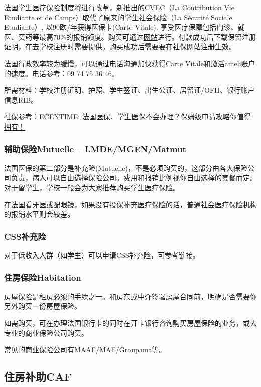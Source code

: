 \documentclass[UTF8]{ctexart}
\begin{document}
法国学生医疗保险制度将进行改革，新推出的CVEC（La Contribution Vie Etudiante et de Camps）取代了原来的学生社会保险（La Sécurité Sociale Etudiante）, 以90欧/年获得医保卡(Carte Vitale), 享受医疗保障包括门诊、就医、买药等最高70\%的报销额度。购买可通过\href{https://www.messervices.etudiant.gouv.fr}{网站}进行。付款成功后下载保留注册证明，在去学校注册时需要提供。购买成功后需要要在社保网站注册生效。

法国行政效率较为缓慢，可以通过电话沟通加快获得Carte Vitale和激活ameli账户的速度。\href{https://www.ameli.fr/paris/assure/english-pages}{电话参考}：09 74 75 36 46。

所需材料：学校注册证明、护照、学生签证、出生公证、居留证/OFII、银行账户信息RIB。

社保参考：\href{https://www.ecentime.com/article/assurance-maladie}{ECENTIME: 法国医保、学生医保不会办理？保姆级申请攻略你值得拥有！}
 
\subsubsection{辅助保险Mutuelle – LMDE/MGEN/Matmut}

法国医保的第二部分是补充险(Mutuelle)，不是必须购买的，这部分由各大保险公司负责，病人可以自由选择保险公司。费用和报销比例视你自由选择的套餐而定。对于留学生，学校一般会为大家推荐购买学生医疗保险。

在法国看牙医或配眼镜，如果没有投保补充医疗保险的话，普通社会医疗保险机构的报销水平则会较差。

\subsubsection{CSS补充险}
对于低收入人群（如学生）可以申请CSS补充险，可参考\href{https://www.xiaohongshu.com/explore/6244b05d00000000210386be?note_flow_source=wechat}{链接}。

\subsubsection{住房保险Habitation} 
房屋保险是租房必须的手续之一。和房东或中介签署房屋合同前，明确是否需要你另外购买一份房屋保险。

如需购买，可在办理法国银行卡的同时在开卡银行咨询购买房屋保险的业务，或去专业的商业保险公司购买。

常见的商业保险公司有MAAF/MAE/Groupama等。

\subsection{住房补助CAF}
	
\end{document}
